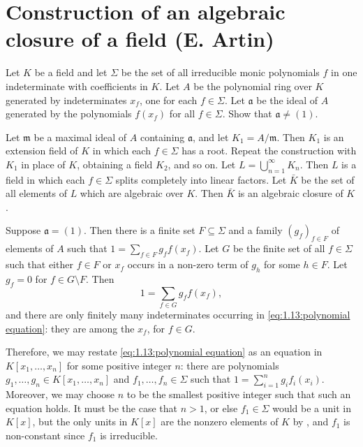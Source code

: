 \section{Construction of an algebraic closure of a field (E. Artin)}

\begin{exercise}
Let \(K\) be a field and let \(\Sigma\) be the set of all irreducible monic polynomials \(f\) in one indeterminate with coefficients in \(K\).
Let \(A\) be the polynomial ring over \(K\) generated by indeterminates \(x_f\), one for each \(f \in \Sigma\).
Let \(\mathfrak a\) be the ideal of \(A\) generated by the polynomials  \(f(x_f)\) for all \(f\in \Sigma\).
Show that \(\mathfrak a \neq (1)\).

Let \(\mathfrak m\) be a maximal ideal of \(A\) containing \(\mathfrak a\), and let \(K_1 = A/\mathfrak m\).
Then \(K_1\) is an extension field of \(K\) in which each \(f \in \Sigma\) has a root.
Repeat the construction with \(K_1\) in place of \(K\), obtaining a field \(K_2\), and so on.
Let \(L = \bigcup_{n=1}^\infty K_n\).
Then \(L\) is a field in which each \(f \in \Sigma\) splits completely into linear factors.
Let \(\bar K\) be the set of all elements of \(L\) which are algebraic over \(K\).
Then \(\bar K\) is an algebraic closure of \(K\).
\end{exercise}

\begin{solution}
Suppose \(\mathfrak{a} = (1)\).
Then there is a finite set \(F \subseteq \Sigma\) and a family \((g_f)_{f \in F}\) of elements of \(A\) such that \(1 = \sum_{f \in F} g_f f(x_f)\).
Let \(G\) be the finite set of all \(f \in \Sigma\) such that either \(f \in F\) or \(x_f\) occurs in a non-zero term of \(g_h\) for some \(h \in F\).
Let \(g_f = 0\) for \(f \in G \setminus F\).
Then
\begin{equation}
\label{eq:1.13:polynomial equation}
1 = \sum_{f \in G} g_f f(x_f),
\end{equation}
and there are only finitely many indeterminates occurring in \eqref{eq:1.13:polynomial equation}: they are among the \(x_f\), for \(f \in G\).

Therefore, we may restate \eqref{eq:1.13:polynomial equation} as an equation in \(K[x_1, \ldots, x_n]\) for some positive integer \(n\): there are polynomials \(g_1, \ldots, g_n \in K[x_1, \ldots, x_n]\) and \(f_1, \ldots, f_n \in \Sigma\) such that \(1 = \sum_{i=1}^n g_i f_i(x_i)\).
Moreover, we may choose \(n\) to be the smallest positive integer such that such an equation holds.
It must be the case that \(n > 1\), or else \(f_1 \in \Sigma\) would be a unit in \(K[x]\), but the only units in \(K[x]\) are the nonzero elements of \(K\) by , and \(f_1\) is non-constant since \(f_1\) is irreducible.

\end{solution}
